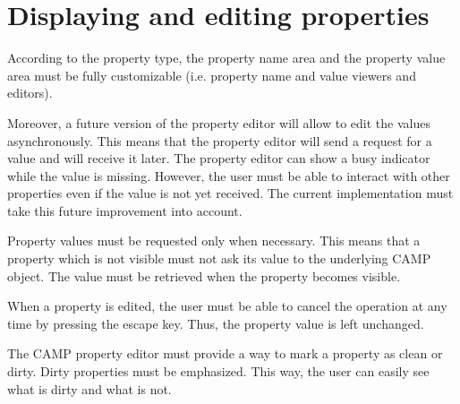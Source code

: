\documentclass[a4paper, twoside]{report}
\begin{document}
\section{Displaying and editing properties}


According to the property type, the property name area and the property value area must be fully
customizable (i.e. property name and value viewers and editors).

Moreover, a future version of the property editor will allow to edit the values asynchronously. This
means that the property editor will send a request for a value and will receive it later. The property
editor can show a busy indicator while the value is missing. However, the user must be able to
interact with other properties even if the value is not yet received. The current implementation
must take this future improvement into account.

Property values must be requested only when necessary. This means that a property which is not visible
must not ask its value to the underlying CAMP object. The value must be retrieved when the property
becomes visible.

When a property is edited, the user must be able to cancel the operation at any time by
pressing the escape key. Thus, the property value is left unchanged.

The CAMP property editor must provide a way to mark a property as clean or dirty. Dirty properties must be
emphasized. This way, the user can easily see what is dirty and what is not.
\end{document}
